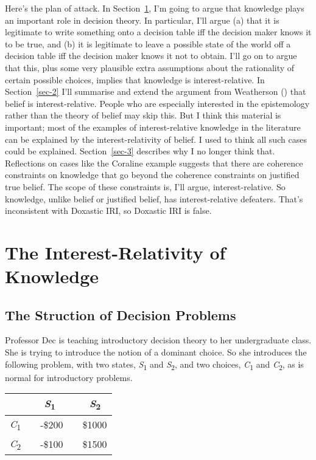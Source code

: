 \documentclass[
  11pt,
  letterpaper,
  DIV=11,
  numbers=noendperiod,
  twoside]{scrartcl}
\begin{document}
Here's the plan of attack. In Section~\ref{sec-1}, I'm going to argue
that knowledge plays an important role in decision theory. In
particular, I'll argue (a) that it is legitimate to write something onto
a decision table iff the decision maker knows it to be true, and (b) it
is legitimate to leave a possible state of the world off a decision
table iff the decision maker knows it not to obtain. I'll go on to argue
that this, plus some very plausible extra assumptions about the
rationality of certain possible choices, implies that knowledge is
interest-relative. In Section~\ref{sec-2} I'll summarise and extend the
argument from Weatherson ()
that belief is interest-relative. People who are especially interested
in the epistemology rather than the theory of belief may skip this. But
I think this material is important; most of the examples of
interest-relative knowledge in the literature can be explained by the
interest-relativity of belief. I used to think all such cases could be
explained. Section~\ref{sec-3} describes why I no longer think that.
Reflections on cases like the Coraline example suggests that there are
coherence constraints on knowledge that go beyond the coherence
constraints on justified true belief. The scope of these constraints is,
I'll argue, interest-relative. So knowledge, unlike belief or justified
belief, has interest-relative defeaters. That's inconsistent with
Doxastic IRI, so Doxastic IRI is false.

\section{The Interest-Relativity of Knowledge}\label{sec-1}

\subsection{The Struction of Decision
Problems}\label{the-struction-of-decision-problems}

Professor Dec is teaching introductory decision theory to her
undergraduate class. She is trying to introduce the notion of a dominant
choice. So she introduces the following problem, with two states,
\emph{S}\textsubscript{1} and \emph{S}\textsubscript{2}, and two
choices, \emph{C}\textsubscript{1} and \emph{C}\textsubscript{2}, as is
normal for introductory problems.

\begin{longtable}[]{@{}lcc@{}}
\toprule\noalign{}
~ & ~\emph{S}\textsubscript{1} ~ & ~\emph{S}\textsubscript{2} \\
\midrule\noalign{}
\endhead
\bottomrule\noalign{}
\endlastfoot
\emph{C}\textsubscript{1}~ & ~-\$200~ & ~\$1000 \\
\emph{C}\textsubscript{2}~ & ~-\$100~ & ~\$1500 \\
\end{longtable}
\end{document}

